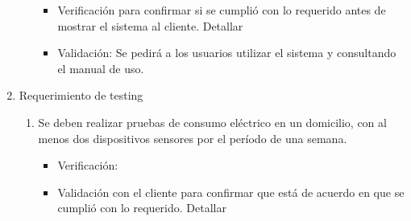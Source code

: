 \documentclass[
11pt, %
]{charter}
\begin{document}
\begin{enumerate}
\begin{enumerate}
		\begin{itemize}
		\item Verificación para confirmar si se cumplió con lo requerido antes de mostrar el sistema al cliente. Detallar 
		\item Validación: Se pedirá a los usuarios utilizar el sistema y consultando el manual de uso.
		\end{itemize}
		
		\end{enumerate}
		
		
		
	
			
	\item Requerimiento de testing
		\begin{enumerate}
		\item Se deben realizar pruebas de consumo eléctrico en un domicilio, con al menos dos dispositivos sensores por el período de una semana.
			\begin{itemize}
			\item Verificación: 
			\item Validación con el cliente para confirmar que está de acuerdo en que se cumplió con lo requerido. Detallar  
			\end{itemize}
			

\end{enumerate}
\end{enumerate}
\end{document}
